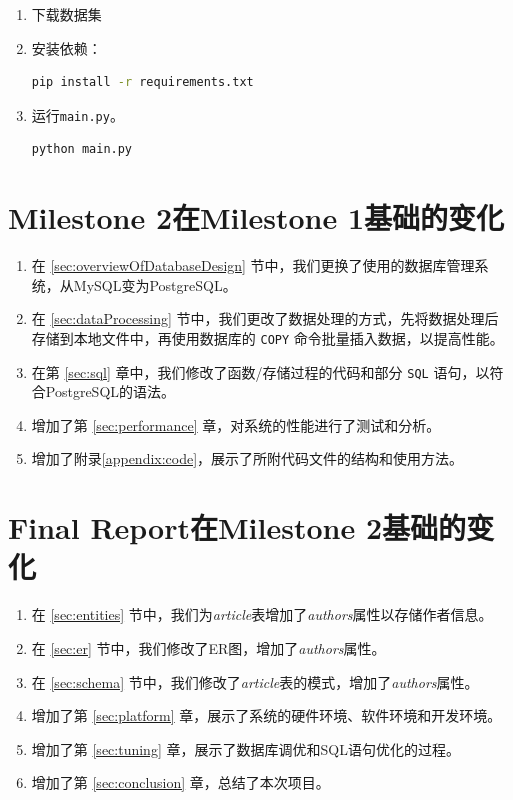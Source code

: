 \documentclass[UTF8,openany]{ctexbook}
\begin{document}
\begin{enumerate}
  \item 下载数据集
  \item 安装依赖：
\begin{lstlisting}[language=bash]
pip install -r requirements.txt
\end{lstlisting}
  \item 运行\texttt{main.py}。
\begin{lstlisting}[language=bash]
python main.py
\end{lstlisting}
\end{enumerate}

\newpage

\chapter{Milestone 2在Milestone 1基础的变化}

\begin{enumerate}
    \item 在 \ref{sec:overviewOfDatabaseDesign} 节中，我们更换了使用的数据库管理系统，从MySQL变为PostgreSQL。
    \item 在 \ref{sec:dataProcessing} 节中，我们更改了数据处理的方式，先将数据处理后存储到本地文件中，再使用数据库的 \texttt{COPY} 命令批量插入数据，以提高性能。
    \item 在第 \ref{sec:sql} 章中，我们修改了函数/存储过程的代码和部分 \texttt{SQL} 语句，以符合PostgreSQL的语法。
    \item 增加了第 \ref{sec:performance} 章，对系统的性能进行了测试和分析。
    \item 增加了附录\ref{appendix:code}，展示了所附代码文件的结构和使用方法。
\end{enumerate}

\newpage

\chapter{Final Report在Milestone 2基础的变化}

\begin{enumerate}
    \item 在 \ref{sec:entities} 节中，我们为\textit{article}表增加了\textit{authors}属性以存储作者信息。
    \item 在 \ref{sec:er} 节中，我们修改了ER图，增加了\textit{authors}属性。
    \item 在 \ref{sec:schema} 节中，我们修改了\textit{article}表的模式，增加了\textit{authors}属性。
    \item 增加了第 \ref{sec:platform} 章，展示了系统的硬件环境、软件环境和开发环境。
    \item 增加了第 \ref{sec:tuning} 章，展示了数据库调优和SQL语句优化的过程。
    \item 增加了第 \ref{sec:conclusion} 章，总结了本次项目。
\end{enumerate}
\end{document}
